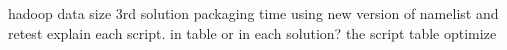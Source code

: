 hadoop data size
3rd solution packaging time using new version of namelist and retest
explain each script. in table or in each solution?
the script table optimize

